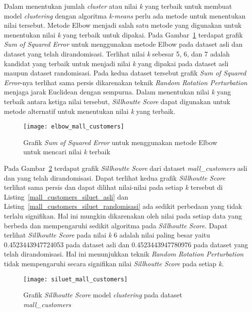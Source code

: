 Dalam menentukan jumlah \textit{cluster} atau nilai \textit{k} yang terbaik untuk membuat model \textit{clustering} dengan algoritma \textit{k-means} perlu ada metode untuk menentukan nilai tersebut. Metode Elbow menjadi salah satu metode yang digunakan untuk  menentukan nilai \textit{k} yang terbaik untuk dipakai. Pada Gambar~\ref{fig:elbow_mall_customers} terdapat grafik \textit{Sum of Squared Error} untuk menggunakan metode Elbow pada dataset asli dan dataset yang telah dirandomisasi. Terlihat nilai \textit{k} sebesar 5, 6, dan 7 adalah kandidat yang terbaik untuk menjadi nilai \textit{k} yang dipakai pada dataset asli maupun dataset randomisasi. Pada kedua dataset tersebut grafik \textit{Sum of Squared Error}-nya terlihat sama persis dikarenakan teknik \textit{Random Rotation Perturbation} menjaga jarak Euclidean dengan sempurna. Dalam menentukan nilai \textit{k} yang terbaik antara ketiga nilai tersebut, \textit{Sillhoutte Score} dapat digunakan untuk metode alternatif untuk menentukan nilai \textit{k} yang terbaik.

\begin{figure}
	\centering
	\texttt{[image: elbow\_mall\_customers]}
	\caption{Grafik \textit{Sum of Squared Error} untuk menggunakan metode Elbow untuk mencari nilai \textit{k} terbaik}
	\label{fig:elbow_mall_customers}
\end{figure}

Pada Gambar~\ref{fig:siluet_mall_customers} terdapat grafik \textit{Sillhoutte Score} dari dataset \textit{mall\_customers} asli dan yang telah dirandomisasi. Dapat terlihat kedua grafik \textit{Sillhoutte Score} terlihat sama persis dan dapat dilihat nilai-nilai pada setiap \textit{k} tersebut di Listing~\ref{mall_customers_siluet_asli} dan Listing~\ref{mall_customers_siluet_randomisasi} ada sedikit perbedaan yang tidak terlalu signifikan. Hal ini mungkin dikarenakan oleh nilai pada setiap data yang berbeda dan mempengaruhi sedikit algoritma pada \textit{Sillhoutte Score}. Dapat terlihat \textit{Sillhoutte Score} pada nilai \textit{k} 6 adalah nilai paling besar yaitu 0.4523443947724053 pada dataset asli dan 0.4523443947780976 pada dataset yang telah dirandomisasi. Hal ini menunjukkan teknik \textit{Random Rotation Perturbation} tidak mempengaruhi secara signifikan nilai \textit{Sillhoutte Score} pada setiap \textit{k}.

\begin{figure}
	\centering
	\texttt{[image: siluet\_mall\_customers]}
	\caption{Grafik \textit{Sillhoutte Score} model \textit{clustering} pada dataset \textit{mall\_customers}}
	\label{fig:siluet_mall_customers}
\end{figure}
	
